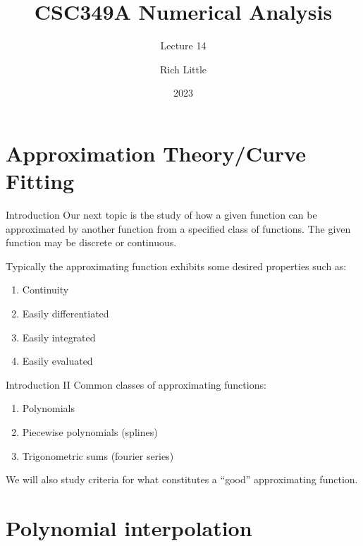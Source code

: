 \documentclass[12pt]{beamer}
\title[CSC349A Numerical Analysis]{CSC349A Numerical Analysis}
\subtitle[Lecture 14]{Lecture 14}
\date[2023]{2023}
\author[R. Little]{Rich Little}
\institute[University of Victoria]{University of Victoria}
\begin{document}
\frame{\maketitle} %




\section{Approximation Theory/Curve Fitting} 


\begin{frame}{Introduction} 
Our next topic is the study of how a given function can be approximated by another function 
from a specified class of functions. The given function may be discrete or continuous. 

Typically the approximating function exhibits some desired properties such as: 

\begin{enumerate} 
\item{Continuity} 
\item{Easily differentiated} 
\item{Easily integrated} 
\item{Easily evaluated} 
\end{enumerate}
\end{frame}

\begin{frame}{Introduction II} 
Common classes of approximating functions: 
\begin{enumerate} 
\item{Polynomials} 
\item{Piecewise polynomials (splines)}
\item{Trigonometric sums (fourier series)}
\end{enumerate} 

We will also study criteria for what constitutes a ``good'' approximating function. 
\end{frame} 

\section{Polynomial interpolation} 
\end{document}
